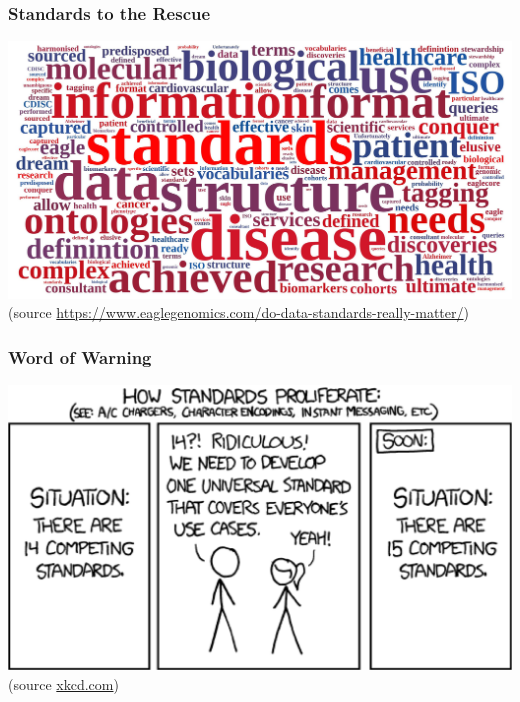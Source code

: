\documentclass{beamer}
\begin{document}
\begin{frame}\frametitle{Standards to the Rescue}
\begin{center}
\includegraphics[width=\textwidth]{figs/standards-cloud}\\
{\footnotesize (source \url{https://www.eaglegenomics.com/do-data-standards-really-matter/})}
\end{center}
\end{frame}

\begin{frame}\frametitle{Word of Warning}
\begin{center}
\includegraphics[width=\textwidth]{figs/XKCD}\\
(source \url{xkcd.com})
\end{center}
\end{frame}
\end{document}
